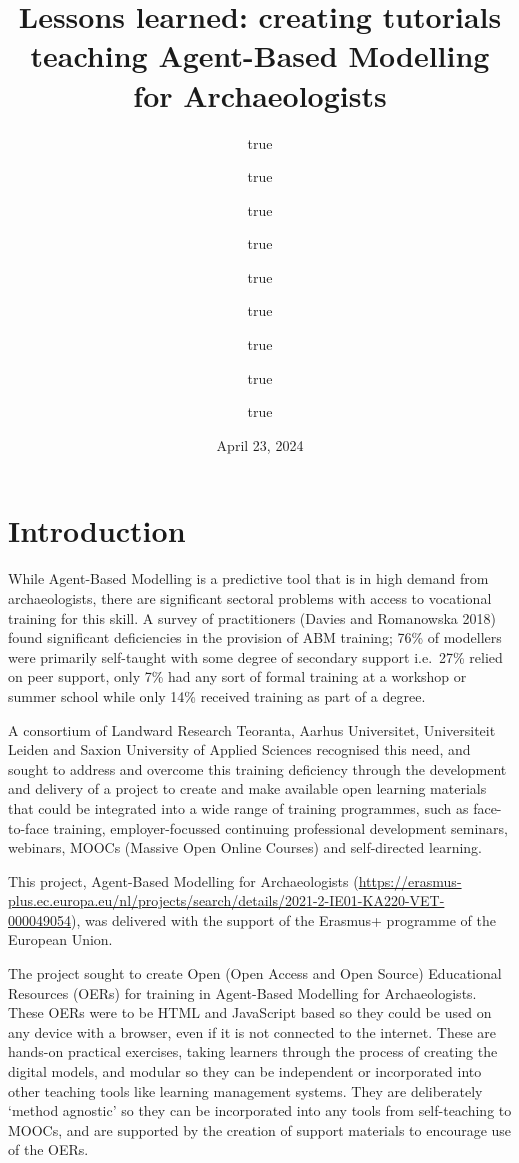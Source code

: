 \documentclass[
]{article}
\title{Lessons learned: creating tutorials teaching Agent-Based Modelling for Archaeologists}
\author{true \and true \and true \and true \and true \and true \and true \and true \and true}
\date{April 23, 2024}
\begin{document}
\maketitle

{
\setcounter{tocdepth}{2}
\tableofcontents
}
\hypertarget{introduction}{%
\section{Introduction}\label{introduction}}

While Agent-Based Modelling is a predictive tool that is in high demand from archaeologists, there are significant sectoral problems with access to vocational training for this skill. A survey of practitioners (Davies and Romanowska 2018) found significant deficiencies in the provision of ABM training; 76\% of modellers were primarily self-taught with some degree of secondary support i.e.~27\% relied on peer support, only 7\% had any sort of formal training at a workshop or summer school while only 14\% received training as part of a degree.

A consortium of Landward Research Teoranta, Aarhus Universitet, Universiteit Leiden and Saxion University of Applied Sciences recognised this need, and sought to address and overcome this training deficiency through the development and delivery of a project to create and make available open learning materials that could be integrated into a wide range of training programmes, such as face-to-face training, employer-focussed continuing professional development seminars, webinars, MOOCs (Massive Open Online Courses) and self-directed learning.

This project, Agent-Based Modelling for Archaeologists (\url{https://erasmus-plus.ec.europa.eu/nl/projects/search/details/2021-2-IE01-KA220-VET-000049054}), was delivered with the support of the Erasmus+ programme of the European Union.

The project sought to create Open (Open Access and Open Source) Educational Resources (OERs) for training in Agent-Based Modelling for Archaeologists. These OERs were to be HTML and JavaScript based so they could be used on any device with a browser, even if it is not connected to the internet. These are hands-on practical exercises, taking learners through the process of creating the digital models, and modular so they can be independent or incorporated into other teaching tools like learning management systems. They are deliberately `method agnostic' so they can be incorporated into any tools from self-teaching to MOOCs, and are supported by the creation of support materials to encourage use of the OERs.
\end{document}
